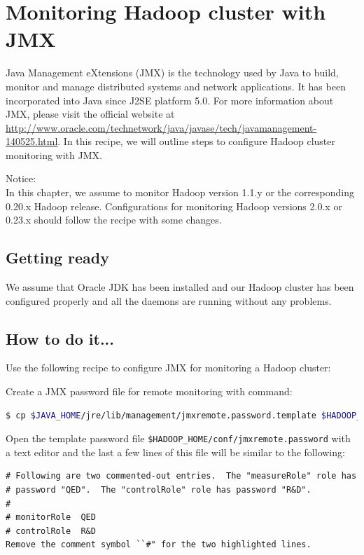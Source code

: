 \section{Monitoring Hadoop cluster with JMX}
Java Management eXtensions (JMX) is the technology used by Java to build, monitor and manage distributed systems and network applications. It has been incorporated into Java since J2SE platform 5.0. For more information about JMX, please visit the official website at \url{http://www.oracle.com/technetwork/java/javase/tech/javamanagement-140525.html}. In this recipe, we will outline steps to configure Hadoop cluster monitoring with JMX.
\begin{info}
Notice: \\
In this chapter, we assume to monitor Hadoop version 1.1.y or the corresponding 0.20.x Hadoop release. Configurations for monitoring Hadoop versions 2.0.x or 0.23.x should follow the recipe with some changes.
\end{info}

\subsection*{Getting ready}
We assume that Oracle JDK has been installed and our Hadoop cluster has been configured properly and all the daemons are running without any problems.

\subsection*{How to do it...}
 Use the following recipe to configure JMX for monitoring a Hadoop cluster:

Create a JMX password file for remote monitoring with command:
\lstset{style=bashstyle}
\begin{lstlisting}[language=bash]
$ cp $JAVA_HOME/jre/lib/management/jmxremote.password.template $HADOOP_HOME/conf/jmxremote.password
\end{lstlisting}

Open the template password file \verb|$HADOOP_HOME/conf/jmxremote.password| with a text editor and the last a few lines of this file will be similar to the following: 
\lstset{style=bashstyle}
\begin{lstlisting}
# Following are two commented-out entries.  The "measureRole" role has
# password "QED".  The "controlRole" role has password "R&D".
#
# monitorRole  QED
# controlRole  R&D
Remove the comment symbol ``#" for the two highlighted lines.
\end{lstlisting}

